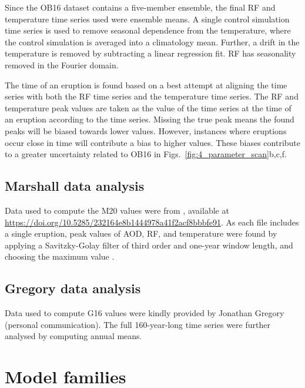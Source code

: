 \documentclass[draft]{agujournal2019}
\begin{document}
  Since the OB16 dataset contains a five-member ensemble, the final RF and temperature
  time series used were ensemble means. A single control simulation time series is used
  to remove seasonal dependence from the temperature, where the control simulation is
  averaged into a climatology mean. Further, a drift in the temperature is removed by
  subtracting a linear regression fit. RF has seasonality removed in the Fourier domain.

  The time of an eruption is found based on a best attempt at aligning the  time
  series with both the RF time series and the temperature time series. The RF and
  temperature peak values are taken as the value of the time series at the time of an
  eruption according to the  time series. Missing the true peak means the found
  peaks will be biased towards lower values. However, instances where eruptions occur
  close in time will contribute a bias to higher values. These biases contribute to a
  greater uncertainty related to OB16 in Figs.~\ref{fig:4_parameter_scan}b,c,f.

  \subsection{Marshall data analysis}

  \label{ap:m20}

  Data used to compute the M20 values were from , available
  at \url{https://doi.org/10.5285/232164e8b1444978a41f2acf8bbbfe91}. As each file
  includes a single eruption, peak values of AOD, RF, and temperature were found by
  applying a Savitzky-Golay filter of third order and one-year window length, and
  choosing the maximum value \cite{savitzky1964}.

  \subsection{Gregory data analysis}

  \label{ap:g16}

  Data used to compute G16 values were kindly provided by Jonathan Gregory (personal
  communication). The full 160-year-long time series were further analysed by computing
  annual means.

  \section{Model families}
\end{document}
